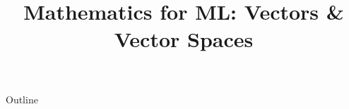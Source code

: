 \documentclass[xcolor=dvipsnames,compress,t,pdf,9pt]{beamer}
\title[\insertframenumber /\inserttotalframenumber]{Mathematics for ML: Vectors \& Vector Spaces}
\begin{document}
	\begin{frame}
	\titlepage
	\end{frame}

	\begin{frame}{Outline}
	    \tableofcontents
	\end{frame}

	
	
	
	
\end{document}

